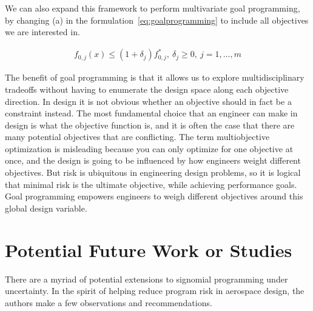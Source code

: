 
We can also expand this framework to perform multivariate goal programming,
by changing (a) in the formulation~\ref{eq:goalprogramming} to include all
objectives we are interested in.

\begin{align*}
    f_{0,j}(x) \leq (1+\delta_j) f^*_{0,j},~\delta_j \geq 0,~j = 1,\ldots, m
    \label{eq:multigoal}
\end{align*}

The benefit of goal programming is that it allows us to explore multidisciplinary tradeoffs without
having to enumerate the design space along each objective direction.
In design it is not obvious whether an objective should in fact be a constraint instead. The most
fundamental choice that an engineer can make in design is what the objective function is, and it is
often the case that there are many potential objectives that are conflicting.
The term multiobjective optimization is misleading
because you can only optimize for one objective at once,
and the design is going to be influenced by how engineers weight different objectives.
But risk is ubiquitous in engineering design problems, so it
is logical that minimal risk is the ultimate objective, while achieving performance
goals. Goal programming empowers engineers to weigh
different objectives around this global design variable.

\section{Potential Future Work or Studies}

There are a myriad of potential extensions to signomial programming under uncertainty.
In the spirit of helping reduce program risk in aerospace design,
the authors make a few observations and recommendations.

